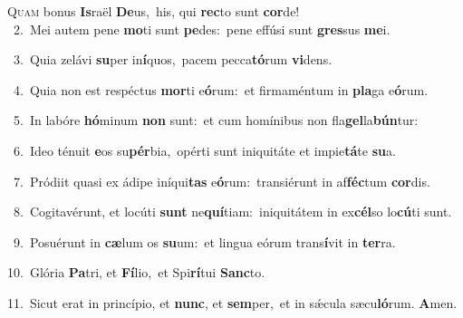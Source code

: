 \lettrine{\initial\textcolor{\initialcolor}{Q}}{uam} bonus \textbf{Is}\-raël \textbf{De}\-us,~\star his, qui \textbf{rec}\-to sunt \textbf{cor}\-de!\\
{\numbfont\textcolor{\numbcolor}{~2.}}~Mei autem pene \textbf{mo}\-ti sunt \textbf{pe}\-des:~\star pene effúsi sunt \textbf{gres}\-sus \textbf{me}\-i.\par
{\numbfont\textcolor{\numbcolor}{~3.}}~Quia zelávi \textbf{su}\-per in\-\textbf{í}\-quos,~\star pacem pecca\-\textbf{tó}\-rum \textbf{vi}\-dens.\par
{\numbfont\textcolor{\numbcolor}{~4.}}~Quia non est respéctus \textbf{mor}\-ti e\-\textbf{ó}\-rum:~\star et firmaméntum in \textbf{pla}\-ga e\-\textbf{ó}\-rum.\par
{\numbfont\textcolor{\numbcolor}{~5.}}~In labóre \textbf{hó}\-minum \textbf{non} sunt:~\star et cum homínibus non fla\-\textbf{gel}\-la\-\textbf{bún}\-tur:\par
{\numbfont\textcolor{\numbcolor}{~6.}}~Ideo ténuit \textbf{e}\-os su\-\textbf{pér}\-bia,~\star opérti sunt iniquitáte et impie\-\textbf{tá}\-te \textbf{su}\-a.\par
{\numbfont\textcolor{\numbcolor}{~7.}}~Pródiit quasi ex ádipe iníqui\textbf{tas} e\-\textbf{ó}\-rum:~\star transiérunt in af\-\textbf{féc}\-tum \textbf{cor}\-dis.\par
{\numbfont\textcolor{\numbcolor}{~8.}}~Cogitavérunt, et locúti \textbf{sunt} ne\-\textbf{quí}\-tiam:~\star iniquitátem in ex\-\textbf{cél}\-so lo\-\textbf{cú}\-ti sunt.\par
{\numbfont\textcolor{\numbcolor}{~9.}}~Posuérunt in \textbf{cæ}\-lum os \textbf{su}\-um:~\star et lingua eórum trans\-\textbf{í}\-vit in \textbf{ter}\-ra.\par
{\numbfont\textcolor{\numbcolor}{10.}}~Glória \textbf{Pa}\-tri, et \textbf{Fí}\-lio,~\star et Spi\-\textbf{rí}\-tui \textbf{Sanc}\-to.\par
{\numbfont\textcolor{\numbcolor}{11.}}~Sicut erat in princípio, et \textbf{nunc}\-, et \textbf{sem}\-per,~\star et in sǽcula sæcu\-\textbf{ló}\-rum. \textbf{A}\-men.\par
